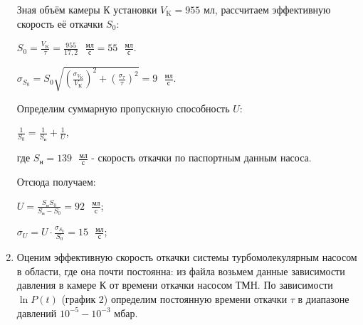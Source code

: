 \documentclass[a4paper,12pt]{article} %
\begin{document}
\begin{enumerate}
\newpage
Зная объём камеры К установки $V_{\text{K}} = 955$ мл, рассчитаем эффективную скорость её откачки $S_{0}$:


$S_{0} = \frac{V_{\text{K}}}{\tau} = \frac{955}{17,2} \text{ }\frac{\text{мл}}{\text{с}} = 55 \text{ }\frac{\text{мл}}{\text{с}}$.

$\sigma_{S_{0}} = S_{0}\sqrt{\left(\frac{\sigma_{V_{\text{K}}}}{V_{\text{K}}}\right)^2 + \left(\frac{\sigma_{\tau}}{\tau}\right)^2} = 9\text{ }\frac{\text{мл}}{\text{с}}$. 

\begin{center}
\end{center}


Определим суммарную пропускную способность $U$:


$\frac{1}{S_{0}} = \frac{1}{S_{\text{н}}} + \frac{1}{U}$,

где $S_{\text{н}} = 139\text{ }\frac{\text{мл}}{\text{с}}$ - скорость откачки по паспортным данным насоса.

Отсюда получаем:

$U = \frac{S_{\text{н}}S_{0}}{S_{\text{н}} - S_{0}} = 92\text{ }\frac{\text{мл}}{\text{с}}$;

$\sigma_{U} = U \cdot\frac{\sigma_{S_{0}}}{S_{0}} = 15\text{ }\frac{\text{мл}}{\text{с}}$;

\begin{center}
\end{center}






































\item Оценим эффективную скорость откачки системы турбомолекулярным насосом в области, где она почти постоянна: из файла возьмем данные зависимости давления в камере К от времени откачки насосом ТМН. По зависимости $\ln{P}(t)$ (график 2) определим постоянную времени откачки $\tau$ в диапазоне давлений $10^{-5}-10^{-3}$ мбар.


\end{enumerate}
\end{document}
